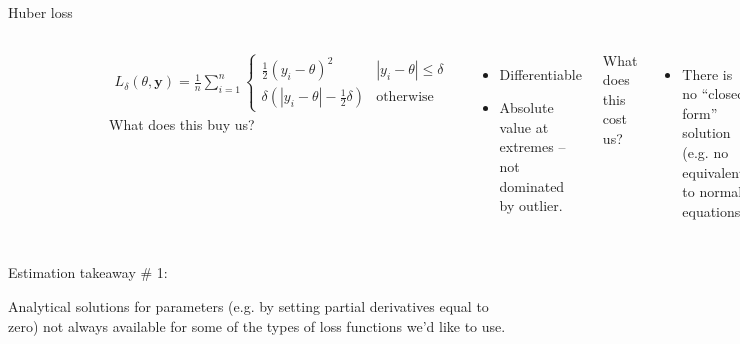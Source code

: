 \documentclass[aspectratio=169, handout]{beamer}
\begin{document}
\begin{frame}{Huber loss}

\begin{columns}
\begin{figure}
\includegraphics[width=0.85\textwidth]{huber}
\caption*{}
\end{figure}
\vspace{-10mm}
\begin{align*}
L_\delta(\theta, \textbf{y}) = \frac{1}{n} \sum_{i=1}^n 
\begin{cases}
    \frac{1}{2}(y_i - \theta)^2 &  | y_i - \theta | \le \delta \\
    \delta ( |y_i - \theta| - \frac{1}{2}\delta ) & \text{otherwise}
\end{cases}
\end{align*}
What does this buy us?
\pause
\begin{itemize}
\item Differentiable
\item Absolute value at extremes -- not dominated by outlier.
\end{itemize}

\vspace{5mm}
\pause
What does this cost us?
\pause
\begin{itemize}
\item There is no ``closed form'' solution (e.g. no equivalent to normal equations).
\end{itemize}
\end{columns}
\end{frame}

\begin{frame}{Estimation takeaway \# 1: }

Analytical solutions for parameters (e.g. by setting partial derivatives equal to zero) not always available for some of the types of loss functions we'd like to use.
\end{frame}
\end{document}

